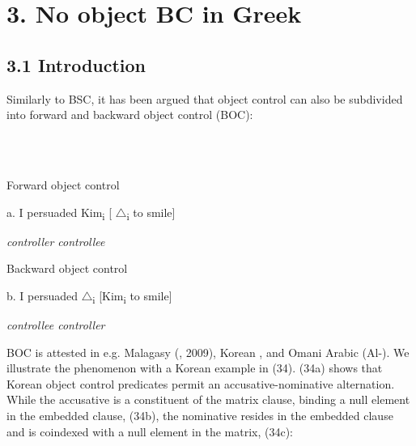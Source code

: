 \documentclass[output=paper]{langsci/langscibook}
\begin{document}
\section{ 3. No object BC in Greek} 

\subsection{ 3.1 Introduction}

\begin{styleNurTexti}
Similarly to BSC, it has been argued that object control can also be subdivided into forward and backward object control (BOC):
\end{styleNurTexti}

\begin{styleNurTexti}
\ea%
    \label{ex:key:33}
    \gll\\
        \\
    \glt
    \z

          Forward object control
\end{styleNurTexti}

\begin{styleNurTexti}
a.  I persuaded   Kim\textsubscript{i}     [ ${\bigtriangleup}$\textsubscript{i} to smile]  
\end{styleNurTexti}

\begin{styleNurTexti}
              \textit{controll}\textit{er  controllee}
\end{styleNurTexti}

\begin{styleNurTexti}
  Backward object control
\end{styleNurTexti}

\begin{styleNurTexti}
  b.  I persuaded  ${\bigtriangleup}$\textsubscript{i}    [Kim\textsubscript{i}    to smile]  
\end{styleNurTexti}

\begin{styleNurTexti}
        \textit{controllee  controller}
\end{styleNurTexti}

BOC is attested in e.g. Malagasy (\citealt{Potsdam2006}, 2009), Korean \citep{Monahan2003}, and Omani Arabic (Al-\citealt{Balushi2008}). We illustrate the phenomenon with a Korean example in (34). (34a) shows that Korean object control predicates permit an accusative-nominative alternation. While the accusative is a constituent of the matrix clause, binding a null element in the embedded clause, (34b), the nominative resides in the embedded clause and is coindexed with a null element in the matrix, (34c):
\end{document}
